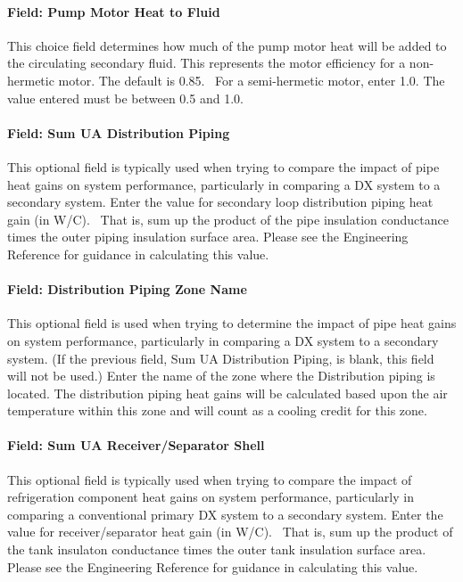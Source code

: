 \paragraph{Field: Pump Motor Heat to Fluid}\label{field-pump-motor-heat-to-fluid}

This choice field determines how much of the pump motor heat will be added to the circulating secondary fluid. This represents the motor efficiency for a non-hermetic motor. The default is 0.85.~ For a semi-hermetic motor, enter 1.0. The value entered must be between 0.5 and 1.0.

\paragraph{Field: Sum UA Distribution Piping}\label{field-sum-ua-distribution-piping}

This optional field is typically used when trying to compare the impact of pipe heat gains on system performance, particularly in comparing a DX system to a secondary system. Enter the value for secondary loop distribution piping heat gain (in W/C).~ That is, sum up the product of the pipe insulation conductance times the outer piping insulation surface area. Please see the Engineering Reference for guidance in calculating this value.

\paragraph{Field: Distribution Piping Zone Name}\label{field-distribution-piping-zone-name}

This optional field is used when trying to determine the impact of pipe heat gains on system performance, particularly in comparing a DX system to a secondary system. (If the previous field, Sum UA Distribution Piping, is blank, this field will not be used.) Enter the name of the zone where the Distribution piping is located. The distribution piping heat gains will be calculated based upon the air temperature within this zone and will count as a cooling credit for this zone.

\paragraph{Field: Sum UA Receiver/Separator Shell}\label{field-sum-ua-receiverseparator-shell}

This optional field is typically used when trying to compare the impact of refrigeration component heat gains on system performance, particularly in comparing a conventional primary DX system to a secondary system. Enter the value for receiver/separator heat gain (in W/C).~ That is, sum up the product of the tank insulaton conductance times the outer tank insulation surface area. Please see the Engineering Reference for guidance in calculating this value.

